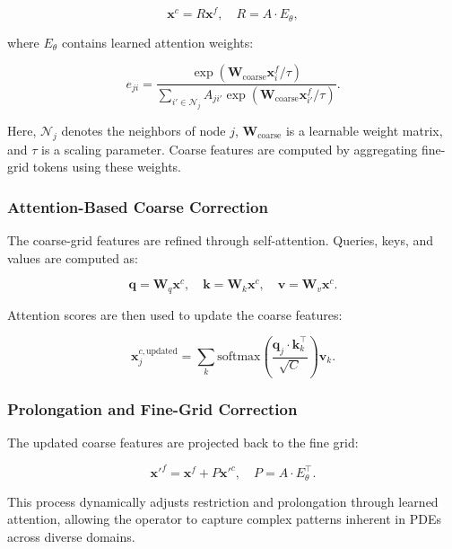 \begin{equation}
    \mathbf{x}^{c} = R \mathbf{x}^{f}, \quad R = A \cdot E_{\theta},
\end{equation}

where \( E_{\theta} \) contains learned attention weights:

\begin{equation}
    e_{ji} = \frac{\exp(\mathbf{W}_{\text{coarse}} \mathbf{x}_{i}^{f} / \tau)}{\sum_{i' \in \mathcal{N}_j} A_{ji'} \exp(\mathbf{W}_{\text{coarse}} \mathbf{x}_{i'}^{f} / \tau)}.
\end{equation}

Here, \( \mathcal{N}_j \) denotes the neighbors of node \( j \), \( \mathbf{W}_{\text{coarse}} \) is a learnable weight matrix, and \( \tau \) is a scaling parameter. Coarse features are computed by aggregating fine-grid tokens using these weights.

\subsubsection{Attention-Based Coarse Correction}

The coarse-grid features are refined through self-attention. Queries, keys, and values are computed as:

\begin{equation}
    \mathbf{q} = \mathbf{W}_{q} \mathbf{x}^{c}, \quad \mathbf{k} = \mathbf{W}_{k} \mathbf{x}^{c}, \quad \mathbf{v} = \mathbf{W}_{v} \mathbf{x}^{c}.
\end{equation}

Attention scores are then used to update the coarse features:

\begin{equation}
    \mathbf{x}_{j}^{c, \text{updated}} = \sum_{k} \text{softmax}\left( \frac{\mathbf{q}_{j} \cdot \mathbf{k}_{k}^{\top}}{\sqrt{C}} \right) \mathbf{v}_{k}.
\end{equation}

\subsubsection{Prolongation and Fine-Grid Correction}

The updated coarse features are projected back to the fine grid:

\begin{equation}
    \mathbf{x}'^{f} = \mathbf{x}^{f} + P \mathbf{x}'^{c}, \quad P = A \cdot E_{\theta}^{\top}.
\end{equation}

This process dynamically adjusts restriction and prolongation through learned attention, allowing the operator to capture complex patterns inherent in PDEs across diverse domains. 


